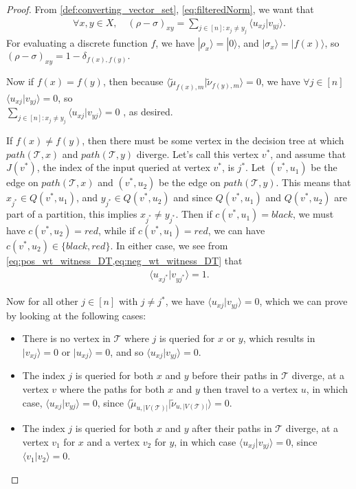 \documentclass[cleveref, autoref, thm-restate,11pt]{article}
\theoremstyle{definition}
\newcommand{\sop}[1]{{\mathcal #1}}
\newcommand{\ket}[1]{|#1\rangle}
\newcommand{\braket}[2]{\langle{#1}|{#2}\rangle}
\begin{document}
\begin{proof}
From \cref{def:converting_vector_set}, \cref{eq:filteredNorm}, we want that 
\begin{align}
\forall x,y\in X,\quad (\rho-\sigma)_{xy}=\sum_{j\in[n]:x_j\neq y_j}\braket{u_{xj}}{v_{yj}}.
\end{align}
For evaluating a discrete function $f$, we have $\ket{\rho_x}=\ket{0}$, and 
$\ket{\sigma_x}=\ket{f(x)}$, so $(\rho-\sigma)_{xy}=1-\delta_{f(x),f(y)}.$

Now if $f(x)=f(y)$, then because $\braket{\tilde{\mu}_{f(x),m}}{\tilde{\nu}_{f(y),m}}=0$,
we have $\forall j\in [n]$ $\braket{u_{xj}}{v_{yj}}=0$, so 
\\$\sum_{j\in [n]:x_j\neq y_j}\braket{u_{xj}}{v_{yj}}=0$
, as desired.

If $f(x)\neq f(y)$, then there must be some vertex in the decision tree at which $path(\sop T,x)$
and $path(\sop T,y)$ diverge. Let's call this vertex $v^*$, and assume that $J(v^*)$, the
index of the input queried at vertex $v^*$, is $j^*$. Let $(v^*,u_1)$ be the edge on 
$path(\sop T,x)$ and $(v^*,u_2)$ be the edge on 
$path(\sop T,y)$. This means that $x_{j^*}\in Q(v^*,u_1)$, and
$y_{j^*}\in Q(v^*,u_2)$ and since $Q(v^*,u_1)$ and $Q(v^*,u_2)$ are part of a partition,
 this implies $x_{j^*}\neq y_{j^*}.$
Then if $c(v^*,u_1)=black$, we must have $c(v^*,u_2)=red$, while if $c(v^*,u_1)=red$, we can have $c(v^*,u_2)\in \{black,red\}$. In either case, we see from \cref{eq:pos_wt_witness_DT,eq:neg_wt_witness_DT} that
\begin{align}
\braket{u_{xj^*}}{v_{yj^*}}=1.
\end{align}

Now for all other $j\in [n]$ with $j\neq j^*$, we have $\braket{u_{xj}}{v_{yj}}=0$, which
we can prove by looking at the following cases:
\begin{itemize}
\item There is no vertex in $\sop T$ where
$j$ is queried for $x$ or $y$, which results in $\ket{v_{xj}}=0$ or $\ket{u_{xj}}=0$, and
so $\braket{u_{xj}}{v_{yj}}=0$.
\item The index $j$ is queried for both $x$ and $y$ before their paths in $\sop T$ diverge, at a vertex
$v$ where the paths for both $x$ and $y$ then travel to a vertex $u$,
in which case, $\braket{u_{xj}}{v_{yj}}=0$, since $\braket{\tilde{\mu}_{u,|V(\sop T)|}}{\tilde{\nu}_{u,|V(\sop T)|}}=0$.
\item The index $j$ is queried for both $x$ and $y$ after their paths in $\sop T$ diverge, at
a vertex $v_1$ for $x$ and a vertex $v_2$ for $y$, in which case $\braket{u_{xj}}{v_{yj}}=0$,
since $\braket{v_1}{v_2}=0$.
\end{itemize}


\end{proof}
\end{document}
